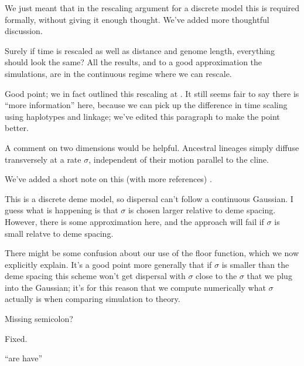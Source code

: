 \reply
We just meant that in the rescaling argument for a discrete model this is required formally,
without giving it enough thought.
We've added more thoughtful discussion.

\begin{point}{\revref}
Surely if time is rescaled as well as distance and genome length, everything should look the same?  
All the results, and to a good approximation the simulations, are in the continuous regime where we can rescale.
\end{point}

\reply
Good point; we in fact outlined this rescaling at .
It still seems fair to say there is ``more information'' here, because we can pick up the difference in time scaling
using haplotypes and linkage;
we've edited this paragraph to make the point better.

\begin{point}{}
A comment on two dimensions would be helpful.  
Ancestral lineages simply diffuse transversely at a rate $\sigma$, independent of their motion parallel to the cline.
\end{point}

\reply
We've added a short note on this (with more references) \revref.

\begin{point}{\revref}
This is a discrete deme model, so dispersal can't follow a continuous Gaussian. 
I guess what is happening is that $\sigma$ is chosen larger relative to deme spacing.  
However, there is some approximation here, and the approach will fail if $\sigma$ is small relatve to deme spacing.
\end{point}

\reply
There might be some confusion about our use of the floor function, which we now explicitly explain.
It's a good point more generally that if $\sigma$ is smaller than the deme spacing this scheme won't get dispersal with $\sigma$ close to the $\sigma$ that we plug into the Gaussian;
it's for this reason that we compute numerically what $\sigma$ actually is when comparing simulation to theory.

\begin{point}{}
Missing semicolon?
\end{point}

\reply
Fixed.

\begin{point}{}
``are have''
\end{point}

